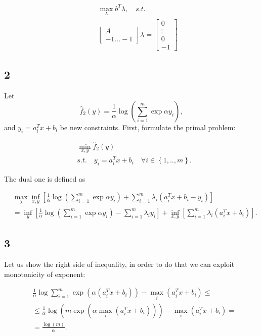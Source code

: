 \documentclass[a4paper,12pt,russian]{extreport}
\begin{document}
\begin{align*}
&\quad \max_{\lambda} b^T\lambda,\quad s.t.\\
&\quad 
\begin{bmatrix}
A\\
-1...-1
\end{bmatrix}\lambda = 
\begin{bmatrix}
0\\
\vdots\\
0\\
-1\end{bmatrix}
\end{align*}

\subsection*{2}

Let 
$$
\hat{f}_2(y)=\frac{1}{\alpha}\log{\left( \sum_{i=1}^m \exp{\alpha y_i}\right)},
$$
and $y_i=a_i^Tx+b_i$ be new constraints. First, formulate the primal problem:

\begin{align*}
& \min_{x,y} \hat{f}_2(y)\\
&s.t. \quad y_i=a_i^Tx+b_i \quad \forall i \in \left\lbrace 1,..,m \right\rbrace.
\end{align*}

The dual one is defined as

\begin{align*}
&\max_{\lambda} \inf_{x,y} \left[\frac{1}{\alpha}\log{\left( \sum_{i=1}^m \exp{\alpha y_i}\right)} + \sum_{i=1}^{m} \lambda_i(a_{i}^Tx + b_i - y_i)\right]=\\
&=\inf_{y} \left[\frac{1}{\alpha}\log{\left( \sum_{i=1}^m \exp{\alpha y_i}\right)}-\sum_{i=1}^m\lambda_iy_i\right]+\inf_{x,y}\left[ \sum_{i=1}^{m} \lambda_i(a_{i}^Tx + b_i)\right].
\end{align*}


\subsection*{3}

Let us show the right side of inequality, in order to do that we can exploit monotonicity of exponent:

\begin{align*}
&\frac{1}{\alpha}\log\sum_{i=1}^m\exp\left(\alpha(a_{i}^Tx+b_i)\right)-\max_{i} (a_{i}^Tx+b_i) \leq \\
&\leq \frac{1}{\alpha}\log\left( m\exp\left(\alpha \max_{i}(a_i^Tx+b_i) \right )\right)-\max_{i} (a_{i}^Tx+b_i)=\\
&= \frac{\log(m)}{\alpha}.
\end{align*}
\end{document}
